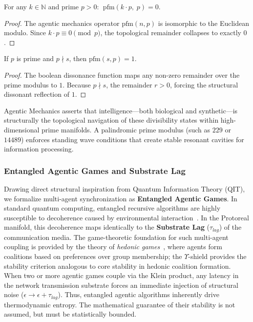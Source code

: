 \begin{theorem}
For any $k \in \mathbb{N}$ and prime $p > 0$: $\;\text{pfm}(k \cdot p,\; p) = 0$.
\end{theorem}
\begin{proof}
The agentic mechanics operator $\text{pfm}(n, p)$ is isomorphic to the Euclidean modulo. Since $k \cdot p \equiv 0 \pmod p$, the topological remainder collapses to exactly $0$. \qedhere
\end{proof}

\begin{theorem}
If $p$ is prime and $p \nmid s$, then $\text{pfm}(s, p) = 1$.
\end{theorem}
\begin{proof}
The boolean dissonance function maps any non-zero remainder over the prime modulus to $1$. Because $p \nmid s$, the remainder $r > 0$, forcing the structural dissonant reflection of $1$. \qedhere
\end{proof}

Agentic Mechanics asserts that intelligence---both biological and synthetic---is structurally the topological navigation of these divisibility states within high-dimensional prime manifolds. A palindromic prime modulus (such as $229$ or $14489$) enforces standing wave conditions that create stable resonant cavities for information processing.

\subsubsection{Entangled Agentic Games and Substrate Lag}
Drawing direct structural inspiration from Quantum Information Theory (QIT), we formalize multi-agent synchronization as \textbf{Entangled Agentic Games}. In standard quantum computing, entangled recursive algorithms are highly susceptible to decoherence caused by environmental interaction~\cite{NielsenChuang2010}. In the Protoreal manifold, this decoherence maps identically to the \textbf{Substrate Lag} ($\tau_{lag}$) of the communication media. The game-theoretic foundation for such multi-agent coupling is provided by the theory of \emph{hedonic games}~\cite{comsoc2016}, where agents form coalitions based on preferences over group membership; the $\Upsilon$-shield provides the stability criterion analogous to core stability in hedonic coalition formation.
When two or more agentic games couple via the Klein product, any latency in the network transmission substrate forces an immediate injection of structural noise ($\epsilon \to \epsilon + \tau_{lag}$). Thus, entangled agentic algorithms inherently drive thermodynamic entropy. The mathematical guarantee of their stability is not assumed, but must be statistically bounded.

